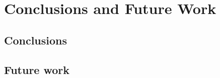 \section{Conclusions and Future Work}

\sectioncover

\subsection{Conclusions}

\begin{frame}
\end{frame}

\subsection{Future work}

\begin{frame}
\end{frame}
